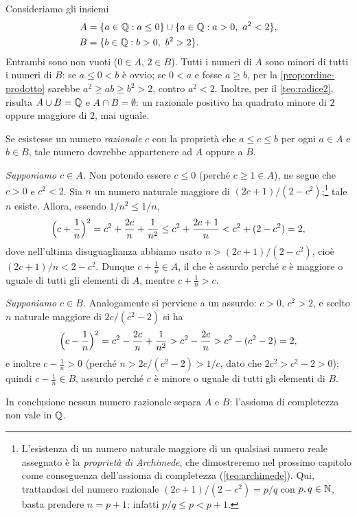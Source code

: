 \begin{dimostrazione}
Consideriamo gli insiemi
\begin{align}
  A&=\{a\in\mathbb{Q} : a\le0\}\cup\{a\in\mathbb{Q} : a>0,\ a^{2}<2\}, \label{eq:AB-radice2}\\
  B&=\{b\in\mathbb{Q} : b>0,\ b^{2}>2\}. \notag
\end{align}
Entrambi sono non vuoti ($0\in A$, $2\in B$). Tutti i numeri di $A$ sono minori di
tutti i numeri di $B$: se $a\le0<b$ è ovvio; se $0<a$ e fosse $a\ge b$, per la
\cref{prop:ordine-prodotto} sarebbe $a^{2}\ge ab\ge b^{2}>2$, contro $a^{2}<2$. Inoltre,
per il \cref{teo:radice2}, risulta $A\cup B=\mathbb{Q}$ e $A\cap B=\emptyset$: un razionale
positivo ha quadrato minore di $2$ oppure maggiore di $2$, mai uguale.

Se esistesse un numero \emph{razionale} $c$ con la proprietà che $a\le c\le b$ per ogni
$a\in A$ e $b\in B$, tale numero dovrebbe appartenere ad $A$ oppure a $B$.

\emph{Supponiamo $c\in A$.} Non potendo essere $c\le0$ (perché $c\ge1\in A$), ne segue
che $c>0$ e $c^{2}<2$. Sia $n$ un numero naturale maggiore di
$(2c+1)/(2-c^{2})$;\footnote{L'esistenza di un numero naturale maggiore di un
qualsiasi numero reale assegnato è la \emph{proprietà di Archimede}, che dimostreremo
nel prossimo capitolo come conseguenza dell'assioma di completezza (\cref{teo:archimede}). Qui, trattandosi
del numero razionale $(2c+1)/(2-c^{2})=p/q$ con $p,q\in\mathbb{N}$, basta prendere
$n=p+1$: infatti $p/q\le p<p+1$.} tale $n$ esiste. Allora, essendo $1/n^{2}\le1/n$,
\begin{equation}\label{eq:stima-radice2}
  \Bigl(c+\frac1n\Bigr)^{2} = c^{2}+\frac{2c}{n}+\frac{1}{n^{2}}
  \le c^{2}+\frac{2c+1}{n} < c^{2}+(2-c^{2}) = 2,
\end{equation}
dove nell'ultima disuguaglianza abbiamo usato $n>(2c+1)/(2-c^{2})$, cioè
$(2c+1)/n<2-c^{2}$. Dunque $c+\frac1n\in A$, il che è assurdo perché $c$ è maggiore o
uguale di tutti gli elementi di $A$, mentre $c+\frac1n>c$.

\emph{Supponiamo $c\in B$.} Analogamente si perviene a un assurdo: $c>0$, $c^{2}>2$, e
scelto $n$ naturale maggiore di $2c/(c^{2}-2)$ si ha
\[
  \Bigl(c-\frac1n\Bigr)^{2} = c^{2}-\frac{2c}{n}+\frac{1}{n^{2}} > c^{2}-\frac{2c}{n}
  > c^{2}-(c^{2}-2) = 2,
\]
e inoltre $c-\frac1n>0$ (perché $n>2c/(c^{2}-2)>1/c$, dato che $2c^{2}>c^{2}-2>0$);
quindi $c-\frac1n\in B$, assurdo perché $c$ è minore o uguale di tutti gli elementi di
$B$.

In conclusione nessun numero razionale separa $A$ e $B$: l'assioma di completezza non
vale in $\mathbb{Q}$.
\end{dimostrazione}

